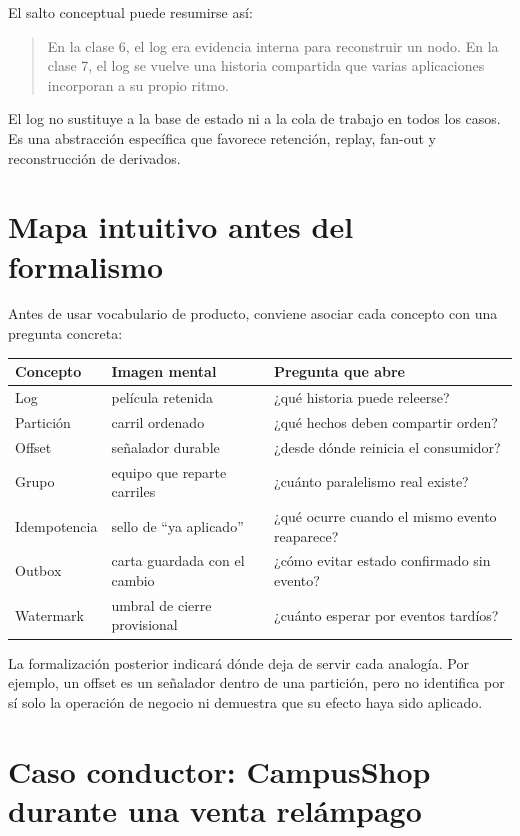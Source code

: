 \documentclass[variant=apuntes,cover=institutional,mode=screen]{ua-engineering-v6-article}
\begin{document}
El salto conceptual puede resumirse así:

\begin{quote}
En la clase 6, el log era evidencia interna para reconstruir un nodo. En la clase 7, el log se vuelve una historia compartida que varias aplicaciones incorporan a su propio ritmo.
\end{quote}

El log no sustituye a la base de estado ni a la cola de trabajo en todos los casos. Es una abstracción específica que favorece retención, replay, fan-out y reconstrucción de derivados.


\section{Mapa intuitivo antes del formalismo}

Antes de usar vocabulario de producto, conviene asociar cada concepto con una pregunta concreta:

\begin{center}
\begin{tabular}{p{}p{}p{}}
\toprule
Concepto & Imagen mental & Pregunta que abre \\
\midrule
Log & película retenida & ¿qué historia puede releerse? \\
Partición & carril ordenado & ¿qué hechos deben compartir orden? \\
Offset & señalador durable & ¿desde dónde reinicia el consumidor? \\
Grupo & equipo que reparte carriles & ¿cuánto paralelismo real existe? \\
Idempotencia & sello de ``ya aplicado'' & ¿qué ocurre cuando el mismo evento reaparece? \\
Outbox & carta guardada con el cambio & ¿cómo evitar estado confirmado sin evento? \\
Watermark & umbral de cierre provisional & ¿cuánto esperar por eventos tardíos? \\
\bottomrule
\end{tabular}
\end{center}

La formalización posterior indicará dónde deja de servir cada analogía. Por ejemplo, un offset es un señalador dentro de una partición, pero no identifica por sí solo la operación de negocio ni demuestra que su efecto haya sido aplicado.

\section{Caso conductor: CampusShop durante una venta relámpago}
\end{document}
